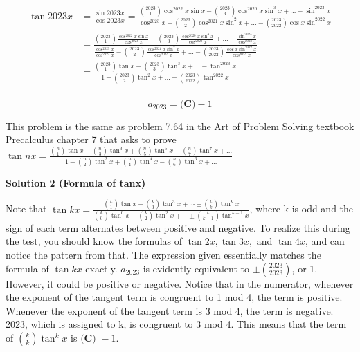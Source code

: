 \begin{enumerate}
 \begin{align*} \tan2023x  &= \frac{ \sin2023x }{ \cos2023x } = \frac{ \binom{2023}{1} \cos^{2022} x \sin x - \binom{2023}{3} \cos^{2020} x \sin^{3} x + \dots - \sin^{2023} x }{ \cos^{2023} x - \binom{2023}{2} \cos^{2021} x \sin^{2} x + \dots - \binom{2023}{2022} \cos x \sin^{2022} x }\\ &= \frac{ \binom{2023}{1} \frac{\cos^{2022} x \sin x}{\cos^{2023} x} - \binom{2023}{3} \frac{\cos^{2020} x \sin^{3} x}{\cos^{2023} x} + \dots - \frac{\sin^{2023} x}{\cos^{2023} x} }{ \frac{\cos^{2023} x}{\cos^{2023} x} - \binom{2023}{2} \frac{\cos^{2021} x \sin^{2} x}{\cos^{2023} x} + \dots - \binom{2023}{2022} \frac{\cos x \sin^{2022} x}{\cos^{2023} x}  }\\ &= \frac{ \binom{2023}{1} \tan x - \binom{2023}{3} \tan^{3}x + \dots - \tan^{2023}x }{ 1 - \binom{2023}{2} \tan^{2}x + \dots - \binom{2023}{2022} \tan^{2022} x }\\ \end{align*}


 \[a_{2023} = \boxed{\textbf{(C)}-1}\]

 This problem is the same as problem 7.64 in the Art of Problem Solving textbook Precalculus chapter 7 that asks to prove $\tan{nx} = \frac{\binom{n}{1}\tan{x} - \binom{n}{3}\tan^{3}{x} + \binom{n}{5}\tan^{5}{x} - \binom{n}{7}\tan^{7}{x} + \dots}{1 - \binom{n}{2}\tan^{2}{x} + \binom{n}{4}\tan^{4}{x}  - \binom{n}{6}\tan^{6}{x} + \dots}$




\textbf{Solution 2 (Formula of tanx)}

Note that $\tan{kx} = \frac{\binom{k}{1}\tan{x} - \binom{k}{3}\tan^{3}{x} + \cdots \pm \binom{k}{k}\tan^{k}{x}}{\binom{k}{0}\tan^{0}{x} - \binom{k}{2}\tan^{2}{x} + \cdots \pm \binom{k}{k-1}\tan^{k-1}{x}}$, where k is odd and the sign of each term alternates between positive and negative. To realize this during the test, you should know the formulas of $\tan{2x}, \tan{3x},$ and $\tan{4x}$, and can notice the pattern from that. The expression given essentially matches the formula of $\tan{kx}$ exactly. $a_{2023}$ is evidently equivalent to $\pm\binom{2023}{2023}$, or 1. However, it could be positive or negative. Notice that in the numerator, whenever the exponent of the tangent term is congruent to 1 mod 4, the term is positive. Whenever the exponent of the tangent term is 3 mod 4, the term is negative. 2023, which is assigned to k, is congruent to 3 mod 4. This means that the term of $\binom{k}{k}\tan^{k}{x}$ is $\boxed{\textbf{(C) } -1}$.


\end{enumerate}
